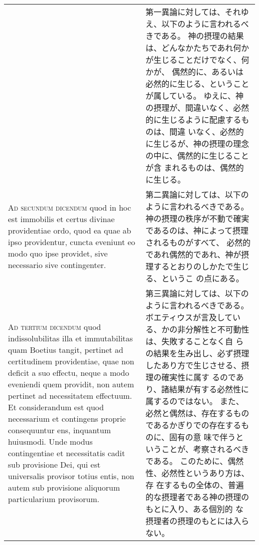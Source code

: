 \documentclass[10pt]{jsarticle} %
\begin{document}
\begin{longtable}{p{21em}p{21em}}
&

第一異論に対しては、それゆえ、以下のように言われるべきである。
神の摂理の結果は、どんなかたちであれ何かが生じることだけでなく、何かが、
 偶然的に、あるいは必然的に生じる、ということが属している。
ゆえに、神の摂理が、間違いなく、必然的に生じるように配慮するものは、間違
 いなく、必然的に生じるが、神の摂理の理念の中に、偶然的に生じることが含
 まれるものは、偶然的に生じる。




\\


{\scshape Ad secundum dicendum} quod in hoc est
immobilis et certus divinae providentiae ordo, quod ea quae ab ipso
providentur, cuncta eveniunt eo modo quo ipse providet, sive necessario
sive contingenter.

&

第二異論に対しては、以下のように言われるべきである。
神の摂理の秩序が不動で確実であるのは、神によって摂理されるものがすべて、
 必然的であれ偶然的であれ、神が摂理するとおりのしかたで生じる、というこ
 の点にある。



\\


{\scshape Ad tertium dicendum} quod indissolubilitas
illa et immutabilitas quam Boetius tangit, pertinet ad certitudinem
providentiae, quae non deficit a suo effectu, neque a modo eveniendi
quem providit, non autem pertinet ad necessitatem effectuum. Et
considerandum est quod necessarium et contingens proprie consequuntur
ens, inquantum huiusmodi. Unde modus contingentiae et necessitatis cadit
sub provisione Dei, qui est universalis provisor totius entis, non autem
sub provisione aliquorum particularium provisorum.

&

第三異論に対しては、以下のように言われるべきである。
ボエティウスが言及している、かの非分解性と不可動性は、失敗することなく自
 らの結果を生み出し、必ず摂理したあり方で生じさせる、摂理の確実性に属す
 るのであり、諸結果が有する必然性に属するのではない。
また、必然と偶然は、存在するものであるかぎりでの存在するものに、固有の意
 味で伴うということが、考察されるべきである。
このために、偶然性、必然性というあり方は、存
 在するもの全体の、普遍的な摂理者である神の摂理のもとに入り、ある個別的
 な摂理者の摂理のもとには入らない。






\end{longtable}
\newpage
\end{document}
